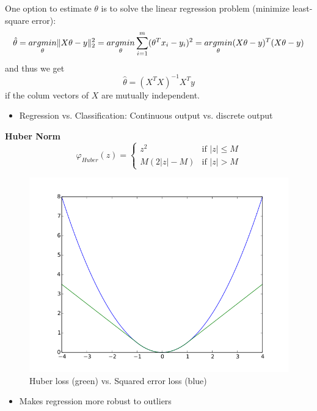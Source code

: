 One option to estimate $\theta$ is to solve the linear regression problem (minimize least-square error):
$$\hat{\theta} = \underset{\theta}{argmin} \lVert X \theta - y\rVert_2^2 = \underset{\theta}{argmin} \sum_{i=1}^{m} (\theta^T x_i - y_i)^2 = \underset{\theta}{argmin} (X \theta - y)^T (X \theta -y)$$
and thus we get
$$ \hat{\theta} = (X^T X)^{-1} X^T y $$
if the colum vectors of $X$ are mutually independent.
\begin{itemize}
    \item
        Regression vs. Classification: Continuous output vs. discrete output\\
\end{itemize}
\textbf{Huber Norm}
$$ \varphi_{Huber}(z) = \begin{cases} z^2 & \text{if } |z| \leq M \\ M(2 |z| - M) & \text{if } |z| > M\end{cases} $$
\begin{figure}[H]
    \centering
    \includegraphics[scale=0.4]{figures/Huber_loss}
    \caption{Huber loss (green) vs. Squared error loss (blue)}
\end{figure}
\begin{itemize}
    \item
        Makes regression more robust to outliers
\end{itemize}


